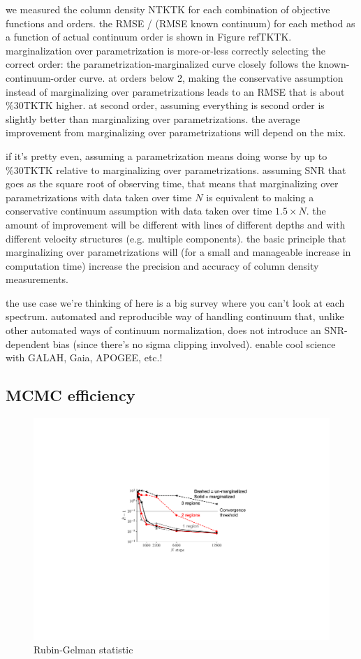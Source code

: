 \documentclass[manuscript]{aastex62}
\begin{document}
we measured the column density NTKTK for each combination of objective functions and orders.
the RMSE / (RMSE known continuum) for each method as a function of actual continuum order is shown in Figure refTKTK.
marginalization over parametrization is more-or-less correctly selecting the correct order: the parametrization-marginalized curve closely follows the known-continuum-order curve.
at orders below 2, making the conservative assumption instead of marginalizing over parametrizations leads to an RMSE that is about \%30TKTK higher.
at second order, assuming everything is second order is slightly better than marginalizing over parametrizations.
the average improvement from marginalizing over parametrizations will depend on the mix.

if it's pretty even, assuming a parametrization means doing worse by up to \%30TKTK relative to marginalizing over parametrizations.
assuming SNR that goes as the square root of observing time, that means that marginalizing over parametrizations with data taken over time $N$ is equivalent to making a conservative continuum assumption with data taken over time $1.5 \times N$.
the amount of improvement will be different with lines of different depths and with different velocity structures (e.g. multiple components).
the basic principle that marginalizing over parametrizations will (for a small and manageable increase in computation time) increase the precision and accuracy of column density measurements.

the use case we're thinking of here is a big survey where you can't look at each spectrum.
automated and reproducible way of handling continuum that, unlike other automated ways of continuum normalization, does not introduce an SNR-dependent bias (since there's no sigma clipping involved).
enable cool science with GALAH, Gaia, APOGEE, etc.!

\subsection{MCMC efficiency}
\label{subsec:multiple-absorption-line-test-case}

\begin{figure}
  \includegraphics{convergence.pdf}
  \caption{Rubin-Gelman statistic}
  \label{fig:convergence-comparison}
\end{figure}
\end{document}
